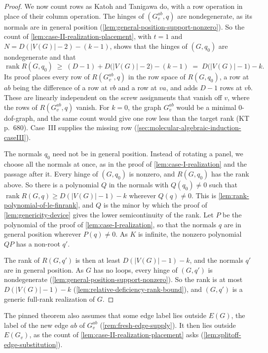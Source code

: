 \begin{proof}
  We now count rows as Katoh and Tanigawa do, with a row operation in
  place of their column operation. The hinges of $(G_v^{ab}, q)$ are
  nondegenerate, as its normals are in general position
  (\cref{lem:general-position-support-nonzero}). So the count of
  \cref{lem:case-II-realization-placement}, with $t = 1$ and
  $N = D(|V(G)| - 2) - (k - 1)$, shows that the hinges of $(G, q_0)$
  are nondegenerate and that
  \[
    \operatorname{rank} R(G, q_0) \;\ge\;
      (D - 1) + D\bigl(|V(G)| - 2\bigr) - (k - 1)
    \;=\; D\bigl(|V(G)| - 1\bigr) - k.
  \]
  Its proof places every row of $R(G_v^{ab}, q)$ in the row space of
  $R(G, q_0)$, a row at $ab$ being the difference of a row at $vb$ and
  a row at $va$, and adds $D - 1$ rows at $vb$. These are linearly
  independent on the screw assignments that vanish off $v$, where the
  rows of $R(G_v^{ab}, q)$ vanish.
  For $k = 0$, the graph $G_v^{ab}$ would be a minimal $0$-dof-graph,
  and the same count would give one row less than the target rank (KT
  p.~680).
  Case~III supplies the missing row
  (\cref{sec:molecular-algebraic-induction-caseIII}).

  The normals $q_0$ need not be in general position. Instead of
  rotating a panel, we choose all the normals at once, as in the proof
  of \cref{lem:case-I-realization} and the passage after it. Every hinge
  of $(G, q_0)$ is nonzero, and $R(G, q_0)$ has the rank above. So there
  is a polynomial $Q$ in the normals with $Q(q_0) \neq 0$ such that
  $\operatorname{rank} R(G, q) \ge D(|V(G)| - 1) - k$ wherever
  $Q(q) \neq 0$. This is \cref{lem:rank-polynomial-of-le-finrank}, and
  $Q$ is the minor by which the proof of \cref{lem:genericity-device}
  gives the lower semicontinuity of the rank. Let $P$
  be the polynomial of the proof of \cref{lem:case-I-realization}, so
  that the normals $q$ are in general position wherever $P(q) \neq 0$.
  As $K$ is infinite, the nonzero polynomial $QP$ has a non-root $q'$.

  The rank of $R(G, q')$ is then at least $D(|V(G)| - 1) - k$, and the
  normals $q'$ are in general position. As $G$ has no loops, every hinge
  of $(G, q')$ is nondegenerate
  (\cref{lem:general-position-support-nonzero}). So the rank is at most
  $D(|V(G)| - 1) - k$ (\cref{lem:relative-deficiency-rank-bound}), and
  $(G, q')$ is a generic full-rank realization of $G$.
\end{proof}

\begin{fmlnote}
  The pinned theorem also assumes that some edge label lies outside
  $E(G)$, the label of the new edge $ab$ of $G_v^{ab}$
  (\cref{rem:fresh-edge-supply}). It then lies outside $E(G_v)$, as the
  count of \cref{lem:case-II-realization-placement} asks
  (\cref{lem:splitoff-edge-substitution}).
\end{fmlnote}
